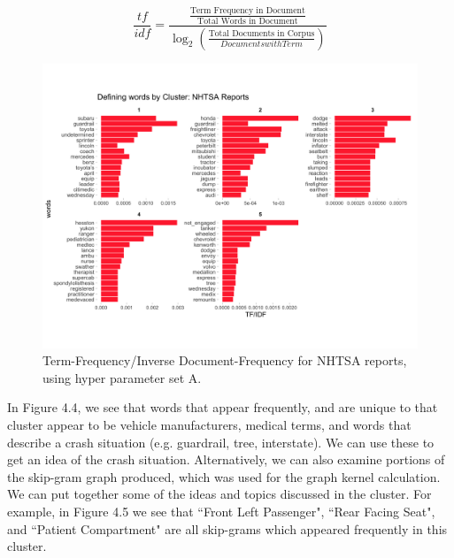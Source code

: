 \begin{equation}
\frac{tf}{idf} = \frac{\frac{\text{Term Frequency in Document}}{\text{Total Words in Document}}}{\log_2(\frac{\text{Total Documents in Corpus}}{Documents with Term})}
\end{equation}

\newpage

\begin{figure}
\includegraphics[width=6in]{Content/Images/nhtsa_tf_idf.png}
\caption{Term-Frequency/Inverse Document-Frequency for NHTSA reports, using hyper parameter set A.}
\end{figure}

In Figure 4.4, we see that words that appear frequently, and are unique to that cluster appear to be vehicle manufacturers, medical terms, and words that describe a crash situation (e.g. guardrail, tree, interstate). We can use these to get an idea of the crash situation. Alternatively, we can also examine portions of the skip-gram graph produced, which was used for the graph kernel calculation. \\

We can put together some of the ideas and topics discussed in the cluster. For example, in Figure 4.5 we see that ``Front Left Passenger", ``Rear Facing Seat", and ``Patient Compartment" are all skip-grams which appeared frequently in this cluster.\\

